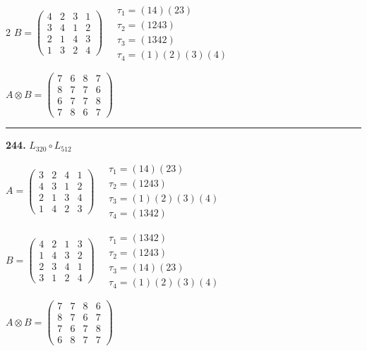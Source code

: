 \begin{multicols}{2}
$B = \begin{pmatrix} 4 & 2 & 3 & 1 \\ 3 & 4 & 1 & 2 \\ 2 & 1 & 4 & 3 \\ 1 & 3 & 2 & 4 \end{pmatrix} \quad \begin{matrix} \tau_{1}=(1 4)(2 3) \\ \tau_{2}=(1 2 4 3) \\ \tau_{3}=(1 3 4 2) \\ \tau_{4}=(1)(2)(3)(4) \end{matrix}$

$A \otimes B = \begin{pmatrix} 7 & 6 & 8 & 7 \\ 8 & 7 & 7 & 6 \\ 6 & 7 & 7 & 8 \\ 7 & 8 & 6 & 7 \end{pmatrix}$

\vspace{0.3em}
\hrule
\vspace{0.3em}

\noindent\textbf{244.} $L_{320} \circ L_{512}$

$A = \begin{pmatrix} 3 & 2 & 4 & 1 \\ 4 & 3 & 1 & 2 \\ 2 & 1 & 3 & 4 \\ 1 & 4 & 2 & 3 \end{pmatrix} \quad \begin{matrix} \tau_{1}=(1 4)(2 3) \\ \tau_{2}=(1 2 4 3) \\ \tau_{3}=(1)(2)(3)(4) \\ \tau_{4}=(1 3 4 2) \end{matrix}$

$B = \begin{pmatrix} 4 & 2 & 1 & 3 \\ 1 & 4 & 3 & 2 \\ 2 & 3 & 4 & 1 \\ 3 & 1 & 2 & 4 \end{pmatrix} \quad \begin{matrix} \tau_{1}=(1 3 4 2) \\ \tau_{2}=(1 2 4 3) \\ \tau_{3}=(1 4)(2 3) \\ \tau_{4}=(1)(2)(3)(4) \end{matrix}$

$A \otimes B = \begin{pmatrix} 7 & 7 & 8 & 6 \\ 8 & 7 & 6 & 7 \\ 7 & 6 & 7 & 8 \\ 6 & 8 & 7 & 7 \end{pmatrix}$


\end{multicols}
